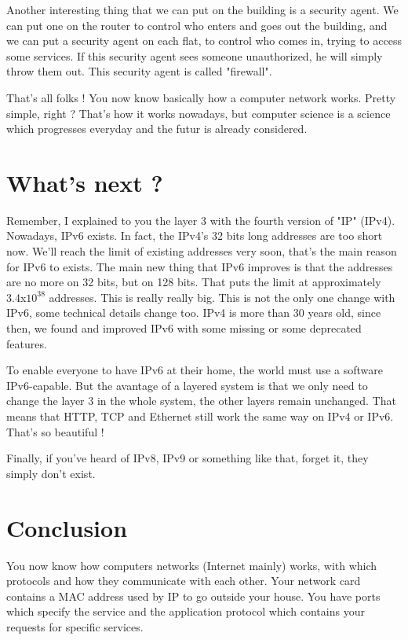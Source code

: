 \documentclass{article}
\begin{document}
	Another interesting thing that we can put on the building is a security agent. We can put one on the router to
	control who enters and goes out the building, and we can put a security agent on each flat, to control who comes in, 
	trying to access some services. If this security agent sees someone unauthorized, he will simply throw them out.
	This security agent is called "firewall".
	
	That's all folks ! You now know basically how a computer network works. Pretty simple, right ? That's how it works
	nowadays, but computer science is a science which progresses everyday and the futur is already considered.

\section{What's next ?}
	Remember, I explained to you the layer 3 with the fourth version of "IP" (IPv4). Nowadays, IPv6 exists. In fact, the
	IPv4's 32 bits long addresses are too short now. We'll reach the limit of existing addresses very soon, that's the
	main reason for IPv6 to exists. The main new thing that IPv6 improves is that the addresses are no more on 32 bits,
	but on 128 bits. That puts the limit at approximately 3.4x$10^{38}$ addresses. This is really really big.
	This is not the only one change with IPv6, some technical details change too. IPv4 is more than 30 years old, 
	since then, we found and improved IPv6 with some missing or some deprecated features.
	
	To enable everyone to have IPv6 at their home, the world must use a software IPv6-capable. But the avantage of a
	layered system is that we only need to change the layer 3 in the whole system, the other layers remain unchanged. That means
	that HTTP, TCP and Ethernet still work the same way on IPv4 or IPv6. That's so beautiful !
	
	Finally, if you've heard of IPv8, IPv9 or something like that, forget it, they simply don't exist.
	\newpage

\section{Conclusion}
	You now know how computers networks (Internet mainly) works, with which protocols and how they communicate with each other.
	Your network card contains a MAC address used by IP to go outside your house. You have ports which specify the service
	and the application protocol which contains your requests for specific services.
	
\end{document}
